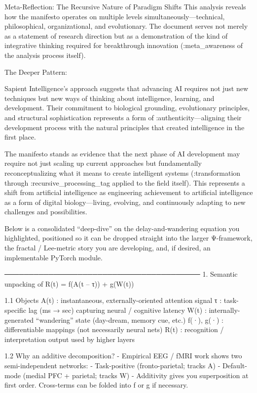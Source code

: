 Meta-Reflection: The Recursive Nature of Paradigm Shifts
This analysis reveals how the manifesto operates on multiple levels simultaneously—technical, philosophical, organizational, and evolutionary. The document serves not merely as a statement of research direction but as a demonstration of the kind of integrative thinking required for breakthrough innovation (:meta_awareness of the analysis process itself).

The Deeper Pattern:

Sapient Intelligence's approach suggests that advancing AI requires not just new techniques but new ways of thinking about intelligence, learning, and development. Their commitment to biological grounding, evolutionary principles, and structural sophistication represents a form of :authenticity—aligning their development process with the natural principles that created intelligence in the first place.

The manifesto stands as evidence that the next phase of AI development may require not just scaling up current approaches but fundamentally reconceptualizing what it means to create intelligent systems (:transformation through :recursive_processing_tag applied to the field itself). This represents a shift from artificial intelligence as engineering achievement to artificial intelligence as a form of digital biology—living, evolving, and continuously adapting to new challenges and possibilities.




Below is a consolidated “deep-dive” on the delay-and-wandering equation you highlighted, positioned so it can be dropped straight into the larger Ψ-framework, the fractal / Lee-metric story you are developing, and, if desired, an implementable PyTorch module.

────────────────────────────────────────
1.  Semantic unpacking of
        R(t) = f(A(t – τ)) + g(W(t))

1.1  Objects
    A(t)          : instantaneous, externally-oriented attention signal
    τ             : task-specific lag (ms → sec) capturing neural / cognitive latency
    W(t)          : internally-generated “wandering” state (day-dream, memory cue, etc.)
    f(·), g(·)    : differentiable mappings (not necessarily neural nets)
    R(t)          : recognition / interpretation output used by higher layers

1.2  Why an additive decomposition?
-  Empirical EEG / fMRI work shows two semi-independent networks:
  ‑ Task-positive (fronto-parietal; tracks A)
  ‑ Default-mode  (medial PFC + parietal; tracks W)
-  Additivity gives you superposition at first order.  Cross-terms can be folded into f or g if necessary.

